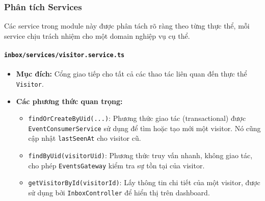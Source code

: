 \subsubsection{Phân tích Services}
\label{subsubsec:inbox-services}

Các service trong module này được phân tách rõ ràng theo từng thực thể, mỗi service chịu trách nhiệm cho một domain nghiệp vụ cụ thể.

\paragraph{\texttt{inbox/services/visitor.service.ts}}
\begin{itemize}
    \item \textbf{Mục đích:} Cổng giao tiếp cho tất cả các thao tác liên quan đến thực thể \texttt{Visitor}.
    \item \textbf{Các phương thức quan trọng:}
    \begin{itemize}
        \item \texttt{findOrCreateByUid(...)}: Phương thức giao tác (transactional) được \texttt{EventConsumerService} sử dụng để tìm hoặc tạo mới một visitor. Nó cũng cập nhật \texttt{lastSeenAt} cho visitor cũ.
        \item \texttt{findByUid(visitorUid)}: Phương thức truy vấn nhanh, không giao tác, cho phép \texttt{EventsGateway} kiểm tra sự tồn tại của visitor.
        \item \texttt{getVisitorById(visitorId)}: Lấy thông tin chi tiết của một visitor, được sử dụng bởi \texttt{InboxController} để hiển thị trên dashboard.
    \end{itemize}
\end{itemize}

